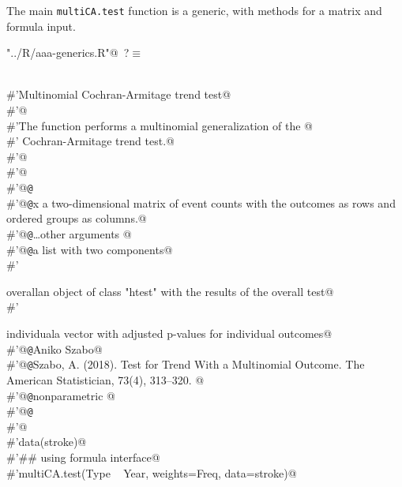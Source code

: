 \documentclass[reqno]{amsart}
\renewcommand{\NWtarget}[2]{\hypertarget{#1}{#2}}
\begin{document}
The main \texttt{multiCA.test} function is a generic, with methods for a matrix and formula input.

\begin{flushleft} \small
\begin{minipage}{\linewidth}\label{scrap1}\raggedright\small
\NWtarget{nuweb?}{} \verb@"../R/aaa-generics.R"@\nobreak\ {\footnotesize {?}}$\equiv$
\vspace{-1ex}
\begin{list}{}{} \item
\mbox{}\verb@@\\
\mbox{}\verb@#'Multinomial Cochran-Armitage trend test@\\
\mbox{}\verb@#'@\\
\mbox{}\verb@#'The  function performs a multinomial generalization of the @\\
\mbox{}\verb@#' Cochran-Armitage trend test.@\\
\mbox{}\verb@#'@\\
\mbox{}\verb@#'@\\
\mbox{}\verb@#'@{\tt @}\verb@export@\\
\mbox{}\verb@#'@{\tt @}\verb@param x a two-dimensional matrix of event counts with the outcomes as rows and ordered groups as columns.@\\
\mbox{}\verb@#'@{\tt @}\verb@param \dots other arguments @\\
\mbox{}\verb@#'@{\tt @}\verb@return a list with two components@\\
\mbox{}\verb@#' \item{overall}{an object of class "htest" with the results of the overall test}@\\
\mbox{}\verb@#' \item{individual}{a vector with adjusted p-values for individual outcomes}@\\
\mbox{}\verb@#'@{\tt @}\verb@author Aniko Szabo@\\
\mbox{}\verb@#'@{\tt @}\verb@references Szabo, A. (2018). Test for Trend With a Multinomial Outcome. The American Statistician, 73(4), 313–320. @\\
\mbox{}\verb@#'@{\tt @}\verb@keywords nonparametric @\\
\mbox{}\verb@#'@{\tt @}\verb@examples@\\
\mbox{}\verb@#'@\\
\mbox{}\verb@#'data(stroke)@\\
\mbox{}\verb@#'## using formula interface@\\
\mbox{}\verb@#'multiCA.test(Type ~ Year, weights=Freq, data=stroke)@\\

\end{list}
\end{minipage}
\end{flushleft}
\end{document}
